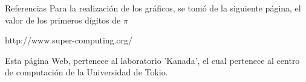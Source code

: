 \begin{section}{Referencias}
	Para la realización de los gráficos, se tomó de la siguiente página, el valor de los primeros dígitos de $\pi$
	
	http://www.super-computing.org/
	
	Esta página Web, pertenece al laboratorio 'Kanada', el cual pertenece al centro de computación de la Universidad de Tokio.


\end{section}
